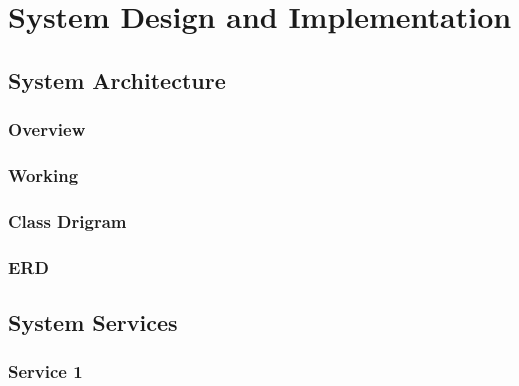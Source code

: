 \chapter{System Design and Implementation}

\section{System Architecture}

\subsection{Overview}

\subsection{Working}

\subsection{Class Drigram}

\subsection{ERD}

\section{System Services}

\subsection{Service 1}
